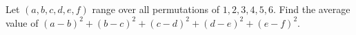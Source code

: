 Let $(a,b,c,d,e,f)$ range over all permutations of $1,2,3,4,5,6$. Find the average value of $(a-b)^2+(b-c)^2+(c-d)^2+(d-e)^2+(e-f)^2$.
